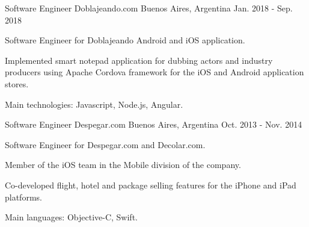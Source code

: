 

\begin{cventries}

    \cventry
      {Software Engineer}
      {Doblajeando.com}
      {Buenos Aires, Argentina}
      {Jan. 2018 - Sep. 2018}
      {
        \begin{cvitems}
          \item Software Engineer for Doblajeando Android and iOS application.
          \item Implemented smart notepad application for dubbing actors and industry producers using Apache Cordova framework for the iOS and Android application stores.
          \item Main technologies: Javascript, Node.js, Angular.
        \end{cvitems}
      } 

    \cventry
      {Software Engineer}
      {Despegar.com}
      {Buenos Aires, Argentina}
      {Oct. 2013 - Nov. 2014}
      {
        \begin{cvitems}
          \item Software Engineer for Despegar.com and Decolar.com. 
          \item Member of the iOS team in the Mobile division of the company. 
          \item Co-developed flight, hotel and package selling features for the iPhone and iPad platforms. 
          \item Main languages: Objective-C, Swift.
        \end{cvitems}
      } 
\end{cventries}
